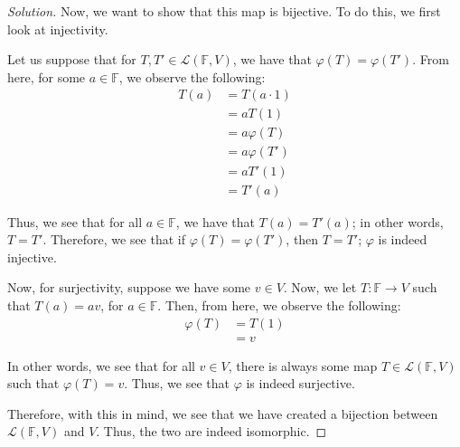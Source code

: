 \documentclass{article}
\newenvironment{solution}{\begin{proof}[Solution]}{\end{proof}}
\begin{document}
\begin{solution}
		Now, we want to show that this map is bijective. To do this, we first look at injectivity.
		
		Let us suppose that for $T, T' \in \mathcal L(\mathbb{F}, V)$, we have that $\varphi (T) = \varphi(T')$. From here, for some $a \in \mathbb{F}$, we observe the following:
		\begin{align*}
			T(a) &= T(a \cdot 1) \\
			&= a T(1) \\
			&= a \varphi(T) \\
			&= a\varphi(T') \\
			&= a T'(1) \\
			&= T'(a)
		\end{align*}
	
		Thus, we see that for all $a \in \mathbb{F}$, we have that $T(a) = T'(a)$; in other words, $T = T'$. Therefore, we see that if $\varphi (T) = \varphi (T')$, then $T = T'$; $\varphi$ is indeed injective.
		\begin{comment}
			
		Now, for surjectivity, we can proceed as follow: let us consider some $v \in V$, and some $T \in \mathcal{L} (\mathbb{F}, V)$ such that $T(a) = av$, for $a \in \mathbb{F}$.
		
		We will check for linearity of this $T$ as follows: suppose we have $\lambda, \mu, a,b \in \mathbb{F}$. Then, we have
		\begin{align*}
			T(\lambda a + \mu b) &= (\lambda a + \mu b)(v) \\
			&= \lambda av + \mu bv \\
			&= \lambda T(a) + \mu T(b)
		\end{align*}
		
		Then, from here, we observe that
		\begin{align*}
			\varphi(T) &= T(1) \\
			&= v
		\end{align*}
		\end{comment}
	
		Now, for surjectivity, suppose we have some $v \in V$. Now, we let $T : \mathbb{F} \rightarrow V$ such that $T(a) = av$, for $a \in \mathbb{F}$. Then, from here, we observe the following:
		\begin{align*}
			\varphi(T) &= T(1) \\
			&= v
		\end{align*}
	
		In other words, we see that for all $v \in V$, there is always some map $T \in \mathcal L(\mathbb{F}, V)$ such that $\varphi(T) = v$. Thus, we see that $\varphi$ is indeed surjective.
		
		Therefore, with this in mind, we see that we have created a bijection between $\mathcal{L}(\mathbb{F}, V)$ and $V$. Thus, the two are indeed isomorphic.
		
	\end{solution}
\end{document}
